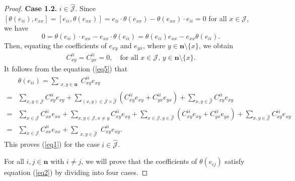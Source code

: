 \documentclass[reqno]{amsart}
\theoremstyle{plain}
\theoremstyle{definition}
\begin{document}
\begin{proof}
\textbf{Case 1.2.} $ i \in \hat{\mathcal{J}} $. Since $ [\theta(e_{ii}), e_{xx}] = [e_{ii}, \theta(e_{xx})] = e_{ii} \cdot  \theta(e_{xx}) - \theta(e_{xx}) \cdot  e_{ii} = 0 $ for all $ x \in \mathcal{J} $, we have 
\[
0 = \theta(e_{ii}) \cdot  e_{xx} - e_{xx} \cdot  \theta(e_{ii}) = \theta(e_{ii}) e_{xx} - e_{xx} \theta(e_{ii}).
\]
Then, equating the coefficients of $ e_{xy} $ and $ e_{yx} $, where $ y \in \mathbf{n} \setminus \{x\} $, we obtain 
 \begin{align}\label{eq5}
 C_{xy}^{ii} = C_{yx}^{ii} = 0, \quad \text{for all } x \in \mathcal{J},\, y \in \mathbf{n} \setminus \{x\}.
 \end{align}
It follows from the equation (\ref{eq5}) that
\[
\begin{aligned}
&\theta(e_{ii}) = \sum_{\substack{x,y \in \mathbf{n}}} C_{xy}^{ii} e_{xy} \\
=&\sum_{x,y \in \mathcal{J}} C_{xy}^{ii} e_{xy}
 +\sum_{(x,y) \in \mathcal{J} \times \hat{\mathcal{J}}} (C_{xy}^{ii} e_{xy}+C_{yx}^{ii} e_{yx})+\sum_{x,y \in \hat{\mathcal{J}}} C_{xy}^{ii} e_{xy}\\
=& \sum_{x \in \mathcal{J}} C_{xx}^{ii} e_{xx} + \sum_{x,y \in \mathcal{J}, x\neq y} C_{xy}^{ii} e_{xy}+
\sum_{x \in \mathcal{J}, y\in \hat{\mathcal{J}}} (C_{xy}^{ii} e_{xy}+C_{yx}^{ii} e_{yx})+\sum_{x,y \in \hat{\mathcal{J}}} C_{xy}^{ii} e_{xy}\\
=& \sum_{x \in \mathcal{J}} C_{xx}^{ii} e_{xx} + \sum_{\substack{x , y \in \hat{\mathcal{J}}}} C_{xy}^{ii} e_{xy}.
\end{aligned}
\]
This proves (\ref{eq1}) for the case $ i \in \hat{\mathcal{J}} $.


For all $ i,j \in \mathbf{n} $ with $ i \neq j $, we will prove that the coefficients of $\theta(e_{ij})$ satisfy equation (\ref{eq2}) by dividing into four cases.


\end{proof}
\end{document}
